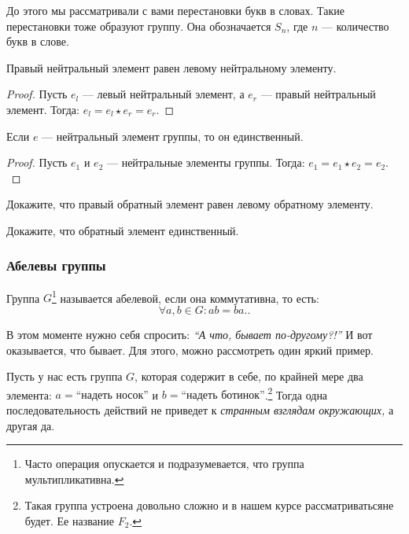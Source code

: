 \begin{example}
    До этого мы рассматривали с вами перестановки букв в словах.
    Такие перестановки тоже образуют группу. Она обозначается $S_n$, 
    где $n$ --- количество букв в слове.
\end{example}

\begin{proposition}
    Правый нейтральный элемент равен левому нейтральному элементу.
\end{proposition}
\begin{proof}
    Пусть $e_l$ --- левый нейтральный элемент, а $e_r$ --- правый нейтральный элемент. Тогда:
    \(
    e_l = e_l \star e_r = e_r.
    \)
\end{proof}
\begin{proposition}
    Если $e$ --- нейтральный элемент группы, то он единственный.
\end{proposition}
\begin{proof}
    Пусть $e_1$ и $e_2$ --- нейтральные элементы группы. Тогда:
    \(
        e_1 = e_1 \star e_2 = e_2.
    \)
\end{proof}
\begin{practice}
    Докажите, что правый обратный элемент равен левому обратному элементу.
\end{practice}
\begin{practice}
    Докажите, что обратный элемент единственный.
\end{practice}
    


\setcounter{footnote}{0}
\subsubsection{Абелевы группы}
\begin{definition}
    Группа $G$\footnote{Часто операция опускается и подразумевается, что группа мультипликативна.} 
    называется абелевой, если она коммутативна, то есть: \[
        \forall a, b \in G: ab = ba.
    .\] 
\end{definition}

\setcounter{footnote}{1}
В этом моменте нужно себя спросить: \emph{``А что, бывает по-другому?!''} И вот оказывается, что бывает.
Для этого, можно рассмотреть один яркий пример. 
\begin{example}
    Пусть у нас есть группа $G$, которая содержит в себе, по крайней мере два элемента: 
    $a = \text{``надеть носок''}$ и $b = \text{``надеть ботинок''}$.\footnote{
    Такая группа устроена довольно сложно и в нашем курсе рассматриватьсяне будет. Ее название $F_2$.}
    Тогда одна последовательность действий не приведет к \emph{странным взглядам окружающих,} а другая да.
\end{example}

